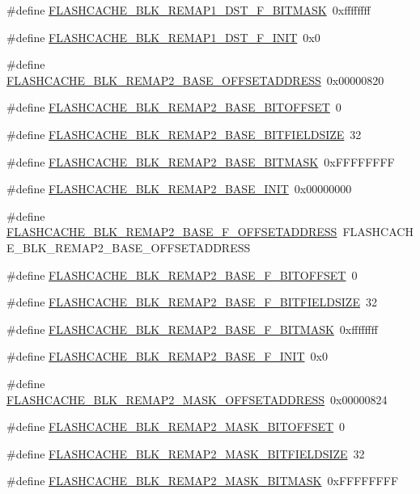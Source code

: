 \begin{DoxyCompactItemize}
\#define \hyperlink{a00550_ae557356998f47649bcc37c1d3544c1c5}{FLASHCACHE\_\-BLK\_\-REMAP1\_\-DST\_\-F\_\-BITMASK}~0xffffffff
\item 
\#define \hyperlink{a00550_accae9927aa814a1e12dc7a8597882f2e}{FLASHCACHE\_\-BLK\_\-REMAP1\_\-DST\_\-F\_\-INIT}~0x0
\item 
\#define \hyperlink{a00550_ae4ced026ad2deee56ebb3c6b6e1d2bcb}{FLASHCACHE\_\-BLK\_\-REMAP2\_\-BASE\_\-OFFSETADDRESS}~0x00000820
\item 
\#define \hyperlink{a00550_a75b6483c23a01a7a28317c9237882dbb}{FLASHCACHE\_\-BLK\_\-REMAP2\_\-BASE\_\-BITOFFSET}~0
\item 
\#define \hyperlink{a00550_a33a558e28dba63dad68f571c1184d4b5}{FLASHCACHE\_\-BLK\_\-REMAP2\_\-BASE\_\-BITFIELDSIZE}~32
\item 
\#define \hyperlink{a00550_af094e56d5ae8057aa7c59cb5822bd6c8}{FLASHCACHE\_\-BLK\_\-REMAP2\_\-BASE\_\-BITMASK}~0xFFFFFFFF
\item 
\#define \hyperlink{a00550_aa3c574b472639478f9f2cb7dbf55b957}{FLASHCACHE\_\-BLK\_\-REMAP2\_\-BASE\_\-INIT}~0x00000000
\item 
\#define \hyperlink{a00550_a588a7a9de46ebe2758be7465d7ec69eb}{FLASHCACHE\_\-BLK\_\-REMAP2\_\-BASE\_\-F\_\-OFFSETADDRESS}~FLASHCACHE\_\-BLK\_\-REMAP2\_\-BASE\_\-OFFSETADDRESS
\item 
\#define \hyperlink{a00550_a7c09e0d755513c92bc75b0c440383862}{FLASHCACHE\_\-BLK\_\-REMAP2\_\-BASE\_\-F\_\-BITOFFSET}~0
\item 
\#define \hyperlink{a00550_aa128324adad1de61cdd9969bfa89d1dc}{FLASHCACHE\_\-BLK\_\-REMAP2\_\-BASE\_\-F\_\-BITFIELDSIZE}~32
\item 
\#define \hyperlink{a00550_a4ac1806c1c6063f7c9ba743fcce7e9b4}{FLASHCACHE\_\-BLK\_\-REMAP2\_\-BASE\_\-F\_\-BITMASK}~0xffffffff
\item 
\#define \hyperlink{a00550_a7a11cdac400150ea0e66ec47ea882e3e}{FLASHCACHE\_\-BLK\_\-REMAP2\_\-BASE\_\-F\_\-INIT}~0x0
\item 
\#define \hyperlink{a00550_abf367ecfb90d17fbfca7eba0816d4fa5}{FLASHCACHE\_\-BLK\_\-REMAP2\_\-MASK\_\-OFFSETADDRESS}~0x00000824
\item 
\#define \hyperlink{a00550_a4584014d27f7b3a75f0fdef9b10a9df7}{FLASHCACHE\_\-BLK\_\-REMAP2\_\-MASK\_\-BITOFFSET}~0
\item 
\#define \hyperlink{a00550_a5f6f37490a0a98c8dd22f0a64d0ec8a5}{FLASHCACHE\_\-BLK\_\-REMAP2\_\-MASK\_\-BITFIELDSIZE}~32
\item 
\#define \hyperlink{a00550_a9e0c84d251c3976716f79ff9fc00663c}{FLASHCACHE\_\-BLK\_\-REMAP2\_\-MASK\_\-BITMASK}~0xFFFFFFFF

\end{DoxyCompactItemize}
